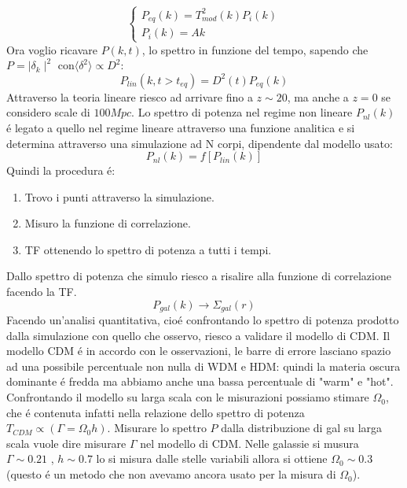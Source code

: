 \documentclass[12pt, a4paper]{article}
\begin{document}
\begin{equation}
\begin{cases}
P_{eq}(k)=T_{mod}^2(k)P_i(k)
\\
P_i(k)=Ak
\end{cases}
\end{equation}
Ora voglio ricavare $P(k,t)$, lo spettro in funzione del tempo, sapendo che $P=\mid \delta_k\mid^2$ con$\langle \delta^2 \rangle \propto D^2$:
\begin{equation}
P_{lin}(k, t>t_{eq})=D^2(t)P_{eq}(k)
\end{equation}
Attraverso la teoria lineare riesco ad arrivare fino a $z\sim20$, ma anche a $z=0$ se considero scale di $100 Mpc$. Lo spettro di potenza nel regime non lineare $P_{nl}(k)$ \'{e} legato a quello nel regime lineare attraverso una funzione analitica e si determina attraverso una simulazione ad N corpi, dipendente dal modello usato:
\begin{equation}
P_{nl}(k)=f[ P_{lin}(k)]
\end{equation}
Quindi la procedura \'{e}:
\begin{enumerate}
\item Trovo i punti attraverso la simulazione.
\item Misuro la funzione di correlazione.
\item TF ottenendo lo spettro di potenza a tutti i tempi.
\end{enumerate}
Dallo spettro di potenza che simulo riesco a risalire alla funzione di correlazione facendo la TF.
\begin{equation}
P_{gal}(k) \longrightarrow \Sigma_{gal}(r)
\end{equation}
Facendo un'analisi quantitativa, cio\'{e} confrontando lo spettro di potenza prodotto dalla simulazione con quello che osservo, riesco a validare il modello di CDM. Il modello CDM \'{e} in accordo con le osservazioni, le barre di errore lasciano spazio ad una possibile percentuale non nulla di WDM e HDM: quindi la materia oscura dominante \'{e} fredda ma abbiamo anche una bassa percentuale di "warm" e "hot". Confrontando il modello su larga scala con le misurazioni possiamo stimare $\Omega_0$, che \'{e} contenuta infatti nella relazione dello spettro di potenza $T_{CDM}\propto (\Gamma=\Omega_0 h)$. Misurare lo spettro $P$ dalla distribuzione di gal su larga scala vuole dire misurare $\Gamma$ nel modello di CDM. Nelle galassie si musura $\Gamma\sim 0.21$ , $h\sim 0.7$ lo si misura dalle stelle variabili allora si ottiene $\Omega_0 \sim 0.3$ (questo \'{e} un metodo che non avevamo ancora usato per la misura di $\Omega_0$).
\end{document}

